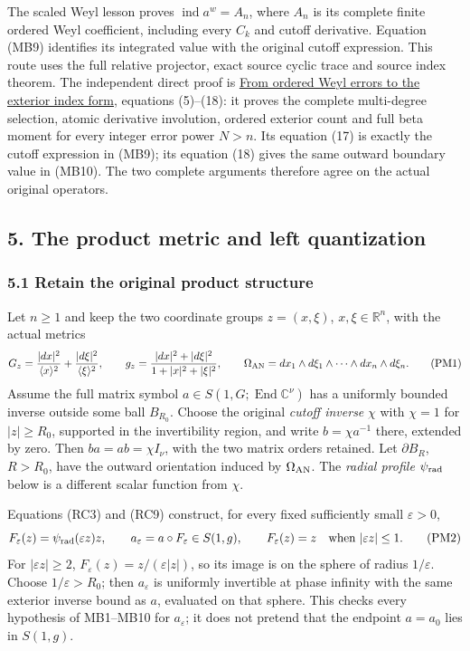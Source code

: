 \documentclass[
  11pt,
]{article}
\begin{document}
The scaled Weyl lesson proves \(\operatorname{ind}a^w=A_n\), where
\(A_n\) is its complete finite ordered Weyl coefficient, including every
\(C_k\) and cutoff derivative. Equation (MB9) identifies its integrated
value with the original cutoff expression. This route uses the full
relative projector, exact source cyclic trace and source index theorem.
The independent direct proof is
\href{ordered-weyl-exterior-reduction.pdf}{From ordered Weyl errors to
the exterior index form}, equations (5)--(18): it proves the complete
multi-degree selection, atomic derivative involution, ordered exterior
count and full beta moment for every integer error power \(N>n\). Its
equation (17) is exactly the cutoff expression in (MB9); its equation
(18) gives the same outward boundary value in (MB10). The two complete
arguments therefore agree on the actual original operators.

\subsection{5. The product metric and left
quantization}\label{the-product-metric-and-left-quantization}

\subsubsection{5.1 Retain the original product
structure}\label{retain-the-original-product-structure}

Let \(n\ge1\) and keep the two coordinate groups \(z=(x,\xi)\),
\(x,\xi\in\mathbb R^n\), with the actual metrics \[
 G_z=\frac{|dx|^2}{\langle x\rangle^2}
       +\frac{|d\xi|^2}{\langle\xi\rangle^2},
 \qquad
 g_z=\frac{|dx|^2+|d\xi|^2}
           {1+|x|^2+|\xi|^2},
 \qquad
 \Omega_{\rm AN}=dx_1\wedge d\xi_1\wedge\cdots
                  \wedge dx_n\wedge d\xi_n .
 \tag{PM1}
\] Assume the full matrix symbol
\(a\in S(1,G;\operatorname{End}\mathbb C^\nu)\) has a uniformly bounded
inverse outside some ball \(B_{R_0}\). Choose the original \emph{cutoff
inverse} \(\chi\) with \(\chi=1\) for \(|z|\ge R_0\), supported in the
invertibility region, and write \(b=\chi a^{-1}\) there, extended by
zero. Then \(ba=ab=\chi I_\nu\), with the two matrix orders retained.
Let \(\partial B_R\), \(R>R_0\), have the outward orientation induced by
\(\Omega_{\rm AN}\). The \emph{radial profile} \(\psi_{\rm rad}\) below
is a different scalar function from \(\chi\).

Equations (RC3) and (RC9) construct, for every fixed sufficiently small
\(\varepsilon>0\), \[
 F_\varepsilon(z)=\psi_{\rm rad}(\varepsilon z)z,\qquad
 a_\varepsilon=a\circ F_\varepsilon\in S(1,g),\qquad
 F_\varepsilon(z)=z
   \quad\text{when }|\varepsilon z|\le1 .
 \tag{PM2}
\] For \(|\varepsilon z|\ge2\), \(F_\varepsilon(z)=z/(\varepsilon|z|)\),
so its image is on the sphere of radius \(1/\varepsilon\). Choose
\(1/\varepsilon>R_0\); then \(a_\varepsilon\) is uniformly invertible at
phase infinity with the same exterior inverse bound as \(a\), evaluated
on that sphere. This checks every hypothesis of MB1--MB10 for
\(a_\varepsilon\); it does not pretend that the endpoint \(a=a_0\) lies
in \(S(1,g)\).
\end{document}
